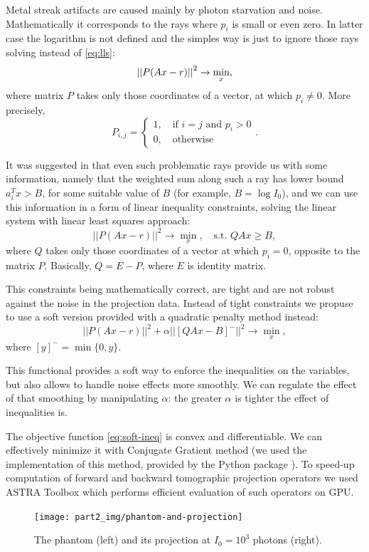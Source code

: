 Metal streak artifacts are caused mainly by photon starvation and noise. Mathematically it corresponds to the rays where $p_i$ is small or even zero. In latter case the logarithm is not defined and the simples way is just to ignore those rays solving instead of \eqref{eq:lls}:
\begin{equation}
  \label{eq:mask-lls}
  \left|\left| P(Ax - r) \right|\right|^2 \to \min\limits_{x},
\end{equation}
where matrix $P$ takes only those coordinates of a vector, at which $p_i \neq 0$. More precisely,
$$
P_{i,j} = \begin{cases}
  1, \quad\text{if $i = j$ and $p_i > 0$} \\
  0, \quad\text{otherwise}
  \end{cases}.
$$

It was suggested in \cite{chukalinaway} that even such problematic rays provide us with some information, namely that the weighted sum along such a ray has lower bound $a_i^T x > B$, for some suitable value of $B$ (for example, $B = \log I_0$), and we can use this information in a form of linear inequality constraints, solving the linear system with linear least squares approach:
\begin{equation}
  ||P(Ax - r)||^2 \to \min\limits_x, \quad\textrm{s.t. }  QAx \ge B,
\end{equation}
where $Q$ takes only those coordinates of a vector at which $p_i = 0$, opposite to the matrix $P$. Basically, $Q = E - P$, where $E$ is identity matrix.

This constraints being mathematically correct, are tight and are not robust against the noise in the projection data. Instead of tight constraints we propuse to use a soft version provided with a quadratic penalty method \cite{nocedal2006numerical} instead:
\begin{equation}
  \label{eq:soft-ineq}
  ||P(Ax - r)||^2 + \alpha ||[QAx - B]^-||^2 \to \min\limits_x,
\end{equation}
where $[y]^- = \min\{0, y\}$.

This functional provides a soft way to enforce the inequalities on the variables, but also allows to handle noise effects more smoothly. We can regulate the effect of that smoothing by manipulating $\alpha$: the greater $\alpha$ is tighter the effect of inequalities is.

The objective function \eqref{eq:soft-ineq} is convex and differentiable. We can effectively minimize it with Conjugate Gratient method (we used the implementation of this method, provided by the Python package \cite{scipy}). To speed-up computation of forward and backward tomographic projection operators we used ASTRA Toolbox \cite{palenstijn2011performance, van2015astra} which performs efficient evaluation of such operators on GPU.
\begin{figure}[h]
  \centering
  \texttt{[image: part2\_img/phantom-and-projection]}
  \caption{The phantom (left) and its projection at $I_0 = 10^3$ photons (right).}
  \label{phantom-and-projection}
\end{figure}

